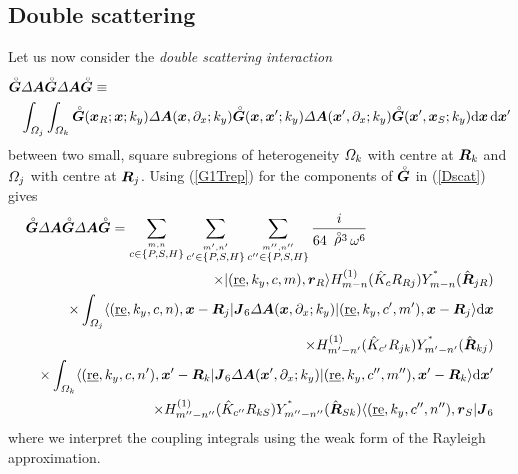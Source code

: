 \subsection{Double scattering}
Let us now consider the {\em double scattering interaction\/} 
\begin{eqnarray} \label{Dscat}
\lefteqn{{\rf{\bmi G}}{\mit \Delta} {\bmi A} {\rf{\bmi G}}
{\mit \Delta} {\bmi A}{\rf{\bmi G}}\equiv}\\
&&
\int_{{\mit \Omega}_j} \int_{{\mit \Omega}_k}{\rf{\bmi G}}({\bmi x}_{R};{\bmi x};k_y)
{\mit \Delta} {\bmi A}({\bmi
x},\partial_{x};k_y) {\rf{\bmi G}}({\bmi x},{\bmi x}^{\prime};k_y)
{\mit \Delta} {\bmi A}({\bmi
x}^{\prime},\partial_{x};k_y) {\rf{\bmi G}}({\bmi x}^{\prime},{\bmi 
x}_{S};k_y) 
{\rm d}{\bmi x}\, {\rm d}{\bmi x}^{\prime}\nonumber
\end{eqnarray}
between two small, 
square subregions of heterogeneity ${\mit \Omega}_k$ with centre at ${\mbox{\boldmath$\mit R$\unboldmath}}_k$ and  ${\mit \Omega}_j$ with centre at ${\mbox{\boldmath$\mit R$\unboldmath}}_j$. 
Using (\ref{G1Trep}) for the components of ${\stackrel{\scriptscriptstyle _{\,\,\circ}}{ \mbox{\boldmath$\mit G$\unboldmath}}}$ in (\ref{Dscat}) 
gives
\begin{eqnarray} \label{Dscat1}
\lefteqn{{\rf{\bmi G}}{\mit \Delta} {\bmi A} {\rf{\bmi G}}
{\mit \Delta} {\bmi A}{\rf{\bmi G}}=
\sum\limits_{\stackrel{m,n}{c\in\{P,S,H\}}} 
\sum\limits_{\stackrel{m^{\prime},n^{\prime}}{c^{\prime}\in\{P,S,H\}}}
\sum\limits_{\stackrel{m^{\prime\prime},n^{\prime\prime}}
{c^{\prime\prime}\in\{P,S,H\}}}
\frac{i }{64\,\rf{\rho}\!\!{}^3\,\omega^6 }
 } \nonumber\\
&&\times
 |(\re,k_y,c,m),{\bmi r}_{R}\rangle {H}_{m-n}^{(1)}(\hat{ K}_{c}{R}_{Rj})
{Y}_{m-n}^{{}^\ast}(\hat{{\bmi R}}_{jR}) \nonumber\\
&&\times 
\int_{{\mit \Omega}_j}  \langle(\re,k_y,c,n),{\bmi x}-{\bmi R}_{j}|{\bmi J}_{6}
{\mit \Delta} {\bmi A}({\bmi
x},\partial_{x};k_y)  |(\re,k_y,c^{\prime},m^{\prime}),{\bmi x}-{\bmi R}_{j}\rangle 
{\rm d}{\bmi x}\nonumber\\
&&
\times {H}_{m^{\prime}-n^{\prime}}^{(1)}(\hat{ K}_{c^{\prime}}{R}_{jk})
{Y}_{m^{\prime}-n^{\prime}}^{{}^\ast}(\hat{{\bmi R}}_{kj}) \nonumber\\
  &&
\times \int_{{\mit \Omega}_k}  \langle(\re,k_y,c,n^{\prime}),{\bmi x}^{\prime}-{\bmi 
R}_{k}|{\bmi J}_{6}
{\mit \Delta} {\bmi A}({\bmi x}^{\prime},\partial_{x};k_y)  
|(\re,k_y,c^{\prime\prime},m^{\prime\prime}),{\bmi x}^{\prime}-{\bmi R}_{k}\rangle 
{\rm d}{\bmi x}^{\prime}\nonumber\\
&&
\times {H}_{m^{\prime\prime}-n^{\prime\prime}}^{(1)}(\hat{ 
K}_{c^{\prime\prime}}{R}_{kS})
{Y}_{m^{\prime\prime}-n^{\prime\prime}}^{{}^\ast}(\hat{{\bmi R}}_{Sk}) 
 \langle(\re,k_y,c^{\prime\prime},n^{\prime\prime}),{\bmi r}_{S}|{\bmi J}_{6}
\end{eqnarray} 
where we interpret the coupling integrals using the weak form 
of the Rayleigh approximation.



